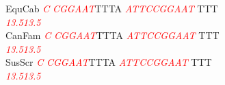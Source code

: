 \documentclass[11pt,twoside,reqno,a4paper]{article}
\begin{document}
{EquCab	\textit{\textcolor{red}{C}}	\textit{\textcolor{red}{C}}\textit{\textcolor{red}{G}}\textit{\textcolor{red}{G}}\textit{\textcolor{red}{A}}\textit{\textcolor{red}{A}}\textit{\textcolor{red}{T}}TTTA	\textit{\textcolor{red}{A}}\textit{\textcolor{red}{T}}\textit{\textcolor{red}{T}}\textit{\textcolor{red}{C}}\textit{\textcolor{red}{C}}\textit{\textcolor{red}{G}}\textit{\textcolor{red}{G}}\textit{\textcolor{red}{A}}\textit{\textcolor{red}{A}}\textit{\textcolor{red}{T}}	TTT\\
\hspace*{7\charwidth}\hspace*{0\charwidth}\textit{\textcolor{red}{13.5}}\hspace*{1\charwidth}\hspace*{1\charwidth}\hspace*{7\charwidth}\textit{\textcolor{red}{13.5}}\hspace*{1\charwidth}\\
CanFam	\textit{\textcolor{red}{C}}	\textit{\textcolor{red}{C}}\textit{\textcolor{red}{G}}\textit{\textcolor{red}{G}}\textit{\textcolor{red}{A}}\textit{\textcolor{red}{A}}\textit{\textcolor{red}{T}}TTTA	\textit{\textcolor{red}{A}}\textit{\textcolor{red}{T}}\textit{\textcolor{red}{T}}\textit{\textcolor{red}{C}}\textit{\textcolor{red}{C}}\textit{\textcolor{red}{G}}\textit{\textcolor{red}{G}}\textit{\textcolor{red}{A}}\textit{\textcolor{red}{A}}\textit{\textcolor{red}{T}}	TTT\\
\hspace*{7\charwidth}\hspace*{0\charwidth}\textit{\textcolor{red}{13.5}}\hspace*{1\charwidth}\hspace*{1\charwidth}\hspace*{7\charwidth}\textit{\textcolor{red}{13.5}}\hspace*{1\charwidth}\\
SusScr	\textit{\textcolor{red}{C}}	\textit{\textcolor{red}{C}}\textit{\textcolor{red}{G}}\textit{\textcolor{red}{G}}\textit{\textcolor{red}{A}}\textit{\textcolor{red}{A}}\textit{\textcolor{red}{T}}TTTA	\textit{\textcolor{red}{A}}\textit{\textcolor{red}{T}}\textit{\textcolor{red}{T}}\textit{\textcolor{red}{C}}\textit{\textcolor{red}{C}}\textit{\textcolor{red}{G}}\textit{\textcolor{red}{G}}\textit{\textcolor{red}{A}}\textit{\textcolor{red}{A}}\textit{\textcolor{red}{T}}	TTT\\
\hspace*{7\charwidth}\hspace*{0\charwidth}\textit{\textcolor{red}{13.5}}\hspace*{1\charwidth}\hspace*{1\charwidth}\hspace*{7\charwidth}\textit{\textcolor{red}{13.5}}\hspace*{1\charwidth}\\
}
\end{document}
